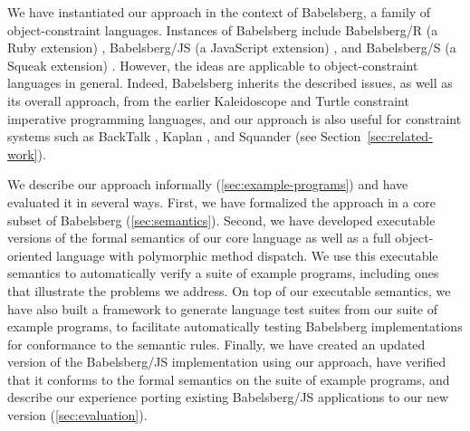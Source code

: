\documentclass[10pt,reprint]{sigplanconf-preprint}
\newcommand{\javascript}{JavaScript\xspace}
\begin{document}
We have instantiated our approach in the context of Babelsberg, a
family of object-constraint languages.  Instances of Babelsberg
include Babelsberg/R (a Ruby extension) \cite{FelgentreffJOT14},
Babelsberg/JS (a \javascript extension) \cite{FelgentreffECOOP14}, and
Babelsberg/S (a Squeak extension) \cite{GraberREBLS2014}.  However,
the ideas are applicable to object-constraint languages in general.
Indeed, Babelsberg inherits the described issues, as well as its
overall approach, from the earlier Kaleidoscope
\cite{freeman-benson-ecoop-1992,lopez1994kaleidoscope}
and Turtle \cite{grabmuller2004turtle}
constraint imperative programming languages, and our approach is also
useful for constraint systems such as BackTalk \cite{pachet1995},
Kaplan \cite{koksal2012constraints}, and Squander \cite{Squander} (see
Section~\ref{sec:related-work}).

We describe our approach informally (\autoref{sec:example-programs}) and have evaluated it in several
ways.  First, we have formalized the approach in a
core subset of Babelsberg (\autoref{sec:semantics}).  Second, we have developed 
executable versions of the formal semantics of our core language as well as 
a full object-oriented language with polymorphic method dispatch. We use this
executable semantics to automatically verify a
  suite of example programs, including ones that illustrate the problems we address.
On top of our executable semantics, we have also built a framework
  to generate language test suites from our suite of example programs, to facilitate
  automatically testing Babelsberg implementations for conformance to
  the semantic rules.
Finally, we have created an updated version of the Babelsberg/JS
implementation using our approach, have verified that it conforms to
the formal semantics on the suite of example programs, and describe
our experience porting existing
  Babelsberg/JS applications to our new version (\autoref{sec:evaluation}).

\end{document}
